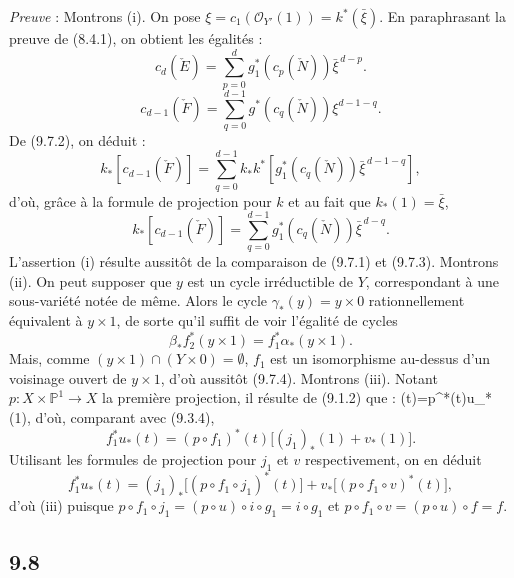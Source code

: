 \emph{Preuve} : Montrons (i). On pose $\xi=c_1(\mathcal{O}_{Y'}(1))=k^*(\bar\xi)$. En paraphrasant la preuve de (8.4.1), on
obtient les égalités :
\[
c_d(\check E)=\sum_{p=0}^d g_1^*(c_p(\check N))\bar\xi^{\,d-p}.
\tag{9.7.1}
\]
\[
c_{d-1}(\check F)=\sum_{q=0}^{d-1}g^*(c_q(\check N))\xi^{d-1-q}.
\tag{9.7.2}
\]
De (9.7.2), on déduit :
\[
k_*[c_{d-1}(\check F)]
=\sum_{q=0}^{d-1}k_*k^*[g_1^*(c_q(\check N))\bar\xi^{\,d-1-q}],
\]
d'où, grâce à la formule de projection pour $k$ et au fait que $k_*(1)=\bar\xi$,
\[
k_*[c_{d-1}(\check F)]=\sum_{q=0}^{d-1}g_1^*(c_q(\check N))\bar\xi^{\,d-q}.
\tag{9.7.3}
\]
L'assertion (i) résulte aussitôt de la comparaison de (9.7.1) et (9.7.3). Montrons (ii). On peut supposer que $y$ est un cycle irréductible de $Y$, correspondant à une sous-variété notée de même. Alors le cycle $\gamma_*(y)=y\times0$  rationnellement équivalent à $y\times1$, de sorte qu'il suffit de voir l'égalité de cycles
\[
\beta_*f_2^*(y\times1)=f_1^*\alpha_*(y\times1).
\tag{9.7.4}
\]
Mais, comme $(y\times1)\cap(Y\times0)=\emptyset$, $f_1$ est un isomorphisme au-dessus d'un voisinage ouvert de $y\times1$, d'où aussitôt (9.7.4). Montrons (iii). Notant $p:X\times\mathbb{P}^1\to X$ la première projection, il résulte de (9.1.2) que :
(t)=p^*(t)\cdot u_*(1),
\]
d'où, comparant avec (9.3.4),
\[
f_1^*u_*(t)=(p\circ f_1)^*(t)\bigl[(j_1)_*(1)+v_*(1)\bigr].
\tag{9.7.6}
\]
Utilisant les formules de projection pour $j_1$ et $v$ respectivement, on en déduit
\[
f_1^*u_*(t)=(j_1)_*\bigl[(p\circ f_1\circ j_1)^*(t)\bigr]+v_*\bigl[(p\circ f_1\circ v)^*(t)\bigr],
\tag{9.7.7}
\]
d'où (iii) puisque $p\circ f_1\circ j_1=(p\circ u)\circ i\circ g_1=i\circ g_1$ et $p\circ f_1\circ v=(p\circ u)\circ f=f$.

\subsection*{9.8}

